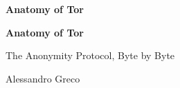 \documentclass[11pt,openright,twoside]{book}
\begin{document}
\frontmatter
\thispagestyle{empty}
\null\vfill
\begin{center}{\LARGE\bfseries Anatomy of Tor\par}\end{center}
\vfill\vfill
\cleardoublepage
\thispagestyle{empty}
\begin{center}
\vspace*{2.5cm}
{\Huge\bfseries Anatomy of Tor\par}
\vspace{0.9cm}
{\Large The Anonymity Protocol, Byte by Byte\par}
\vspace{3.5cm}
{\Large Alessandro Greco\par}
\vfill
\end{center}
\clearpage
\thispagestyle{empty}
\null\vfill
\Colophon
\cleardoublepage
\tableofcontents

\mainmatter

\backmatter
\printbibliography[heading=bibintoc,title={Bibliography}]
\printindex
\end{document}
